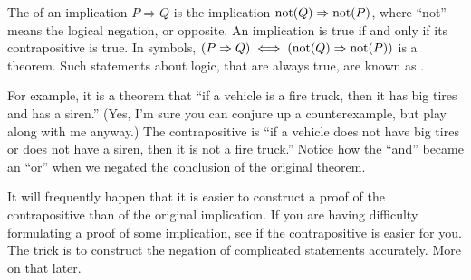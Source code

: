 \begin{para}The  of an implication $P\Rightarrow Q$ is the implication ${\rm not}(Q)\Rightarrow{\rm not}(P)$, where ``not'' means the logical negation, or opposite.  An implication is true if and only if its contrapositive is true.  In symbols, $(P\Rightarrow Q)\iff({\rm not}(Q)\Rightarrow{\rm not}(P))$ is a theorem.  Such statements about logic, that are always true, are known as .\end{para}
%
\begin{para}For example, it is a theorem that ``if a vehicle is a fire truck, then it has big tires and has a siren.''  (Yes, I'm sure you can conjure up a counterexample, but play along with me anyway.)  The contrapositive is  ``if a vehicle does not have big tires or does not have a siren, then it is not a fire truck.''  Notice how the ``and'' became an ``or'' when we negated the conclusion of the original theorem.\end{para}
%
\begin{para}It will frequently happen that it is easier to construct a proof of the contrapositive than of the original implication.  If you are having difficulty formulating a proof of some implication, see if the contrapositive is easier for you.  The trick is to construct the negation of complicated statements accurately.  More on that later.\end{para}
